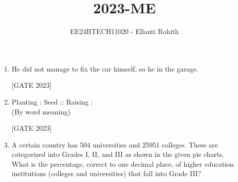 \documentclass[journal,12pt,onecolumn]{IEEEtran}
\theoremstyle{remark}
\begin{document}

\vspace{3cm}

\title{2023-ME}
\author{EE24BTECH11020 -  Ellanti Rohith}
\maketitle

\renewcommand{\thefigure}{\theenumi}
\renewcommand{\thetable}{\theenumi}

\begin{enumerate}
\item He did not manage to fix the car himself, so he \underline{\hspace{2cm}} in the garage.
    
    \hfill{[GATE 2023]}\begin{enumerate}
    \end{enumerate}

     \item Planting : Seed :: Raising : \underline{\hspace{2cm}} \\
    (By word meaning)

    \hfill{[GATE 2023]}\begin{enumerate}
    \end{enumerate}


\item A certain country has 504 universities and 25951 colleges. These are categorized into Grades I, II, and III as shown in the given pie charts.\\ What is the percentage, correct to one decimal place, of higher education institutions (colleges and universities) that fall into Grade III?





\end{enumerate}
\end{document}
